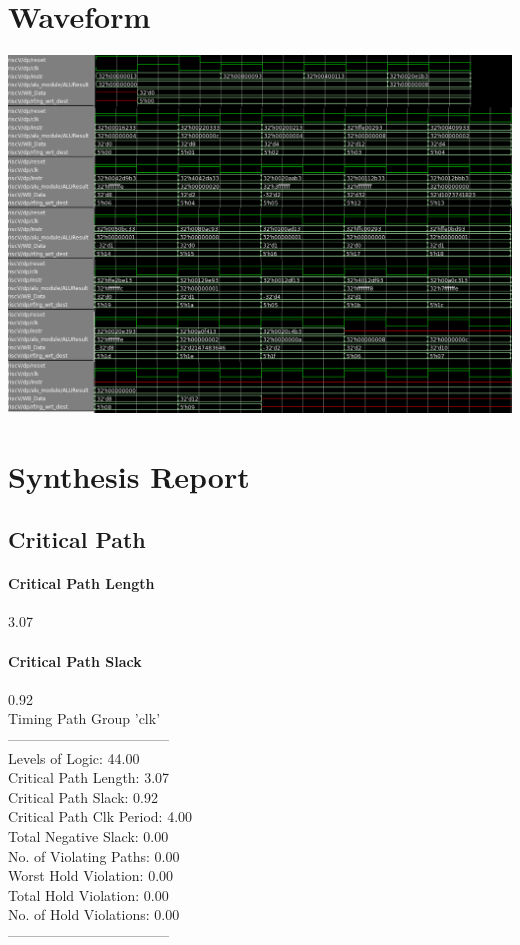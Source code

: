 \documentclass{article}
\begin{document}
	\section{Waveform}
	\includegraphics[scale=0.65]{WaveForm.png}
	\section{Synthesis Report}
	\subsection{Critical Path}
	\paragraph{Critical Path Length} 3.07
	\paragraph{Critical Path Slack}  0.92\\
  Timing Path Group 'clk'\\
  -----------------------------------\\
  Levels of Logic:              44.00\\
  Critical Path Length:          3.07\\
  Critical Path Slack:           0.92\\
  Critical Path Clk Period:      4.00\\
  Total Negative Slack:          0.00\\
  No. of Violating Paths:        0.00\\
  Worst Hold Violation:          0.00\\
  Total Hold Violation:          0.00\\
  No. of Hold Violations:        0.00\\
  -----------------------------------\\
\end{document}
